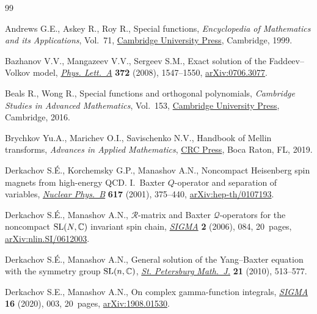 \documentclass[pdftex]{sigma}
\numberwithin{equation}{section}
\begin{document}
\begin{thebibliography}{99}
\footnotesize\itemsep=0pt

Andrews G.E., Askey R., Roy R., Special functions, \textit{Encyclopedia of
 Mathematics and its Applications}, Vol.~71, \href{https://doi.org/10.1017/CBO9781107325937}{Cambridge University Press},
 Cambridge, 1999.

Bazhanov V.V., Mangazeev V.V., Sergeev S.M., Exact solution of the
 {F}addeev--{V}olkov model, \href{https://doi.org/10.1016/j.physleta.2007.10.053}{\textit{Phys. Lett.~A}} \textbf{372} (2008),
 1547--1550, \href{https://arxiv.org/abs/0706.3077}{arXiv:0706.3077}.

Beals R., Wong R., Special functions and orthogonal polynomials,
 \textit{Cambridge Studies in Advanced Mathematics}, Vol.~153, \href{https://doi.org/10.1017/CBO9781316227381}{Cambridge
 University Press}, Cambridge, 2016.

Brychkov Yu.A., Marichev O.I., Savischenko N.V., Handbook of {M}ellin
 transforms, \textit{Advances in Applied Mathematics}, \href{https://doi.org/10.1201/9780429434259}{CRC Press}, Boca Raton, FL, 2019.

Derkachov S.\'E., Korchemsky G.P., Manashov A.N., Noncompact {H}eisenberg spin
 magnets from high-energy {QCD}. {I}.~{B}axter {$Q$}-operator and separation
 of variables, \href{https://doi.org/10.1016/S0550-3213(01)00457-6}{\textit{Nuclear Phys.~B}} \textbf{617} (2001), 375--440,
 \href{https://arxiv.org/abs/hep-th/0107193}{arXiv:hep-th/0107193}.

Derkachov S.\'E., Manashov A.N., {$\mathcal R$}-matrix and {B}axter {$\mathcal
 Q$}-operators for the noncompact {${\rm SL}(N,{\mathbb C})$} invariant spin
 chain, \href{https://doi.org/10.3842/SIGMA.2006.084}{\textit{SIGMA}} \textbf{2} (2006), 084, 20~pages,
 \href{https://arxiv.org/abs/nlin.SI/0612003}{arXiv:nlin.SI/0612003}.

Derkachov S.\'E., Manashov A.N., General solution of the {Y}ang--{B}axter
 equation with the symmetry group ${\rm SL}(n,{\mathbb C})$, \href{https://doi.org/10.1090/S1061-0022-2010-01106-3}{\textit{St.
 Petersburg Math.~J.}} \textbf{21} (2010), 513--577.

Derkachov S.E., Manashov A.N., On complex gamma-function integrals,
 \href{https://doi.org/10.3842/SIGMA.2020.003}{\textit{SIGMA}} \textbf{16} (2020), 003, 20~pages, \href{https://arxiv.org/abs/1908.01530}{arXiv:1908.01530}.


\end{thebibliography}
\end{document}
